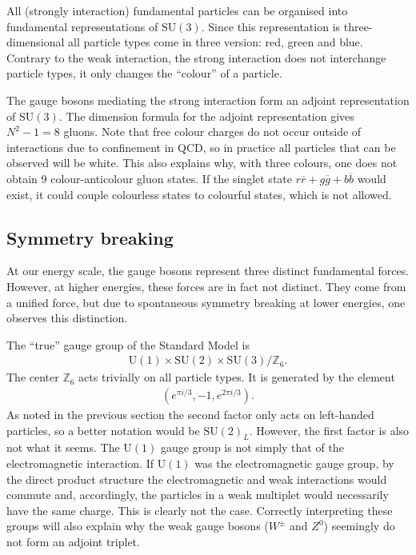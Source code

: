     \begin{property}
        All (strongly interaction) fundamental particles can be organised into fundamental representations of $\mathrm{SU}(3)$. Since this representation is three-dimensional all particle types come in three version: red, green and blue. Contrary to the weak interaction, the strong interaction does not interchange particle types, it only changes the ``colour'' of a particle.

        The gauge bosons mediating the strong interaction form an adjoint representation of $\mathrm{SU}(3)$. The dimension formula for the adjoint representation gives $N^2-1=8$ gluons. Note that free colour charges do not occur outside of interactions due to confinement in QCD, so in practice all particles that can be observed will be white. This also explains why, with three colours, one does not obtain 9 colour-anticolour gluon states. If the singlet state $r\overline{r}+g\overline{g}+b\overline{b}$ would exist, it could couple colourless states to colourful states, which is not allowed.
    \end{property}

\subsection{Symmetry breaking}

    At our energy scale, the gauge bosons represent three distinct fundamental forces. However, at higher energies, these forces are in fact not distinct. They come from a unified force, but due to spontaneous symmetry breaking at lower energies, one observes this distinction.

    The ``true'' gauge group of the Standard Model is
    \begin{gather}
        \mathrm{U}(1)\times\mathrm{SU}(2)\times\mathrm{SU}(3)/\mathbb{Z}_6.
    \end{gather}
    The center $\mathbb{Z}_6$ acts trivially on all particle types. It is generated by the element
    \begin{gather}
        (e^{\pi i/3},-1,e^{2\pi i/3}).
    \end{gather}
    As noted in the previous section the second factor only acts on left-handed particles, so a better notation would be $\mathrm{SU}(2)_L$. However, the first factor is also not what it seems. The $\mathrm{U}(1)$ gauge group is not simply that of the electromagnetic interaction. If $\mathrm{U}(1)$ was the electromagnetic gauge group, by the direct product structure the electromagnetic and weak interactions would commute and, accordingly, the particles in a weak multiplet would necessarily have the same charge. This is clearly not the case. Correctly interpreting these groups will also explain why the weak gauge bosons ($W^\pm$ and $Z^0$) seemingly do not form an adjoint triplet.

